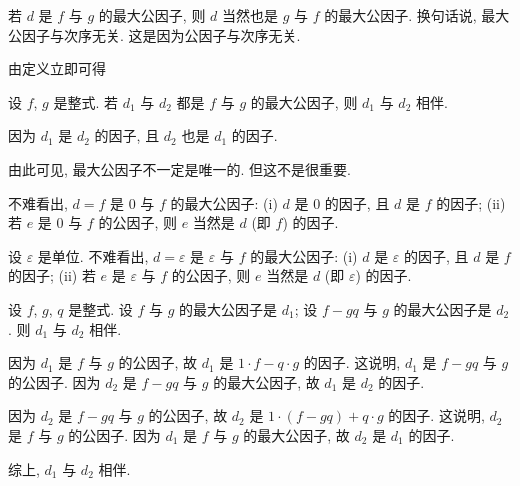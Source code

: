 \begin{remark}
    若 $d$ 是 $f$ 与 $g$ 的最大公因子, 则 $d$ 当然也是 $g$ 与 $f$ 的最大公因子. 换句话说, 最大公因子与次序无关. 这是因为公因子与次序无关.
\end{remark}

由定义立即可得
\begin{proposition}
    设 $f$, $g$ 是整式. 若 $d_1$ 与 $d_2$ 都是 $f$ 与 $g$ 的最大公因子, 则 $d_1$ 与 $d_2$ 相伴.
\end{proposition}

\begin{pf}
    因为 $d_1$ 是 $d_2$ 的因子, 且 $d_2$ 也是 $d_1$ 的因子.
\end{pf}

\begin{remark}
    由此可见, 最大公因子不一定是唯一的. 但这不是很重要.
\end{remark}

\begin{example}
    不难看出, $d = f$ 是 $0$ 与 $f$ 的最大公因子: (i) $d$ 是 $0$ 的因子, 且 $d$ 是 $f$ 的因子; (ii) 若 $e$ 是 $0$ 与 $f$ 的公因子, 则 $e$ 当然是 $d$ (即 $f$) 的因子.
\end{example}

\begin{example}
    设 $\varepsilon$ 是单位. 不难看出, $d = \varepsilon$ 是 $\varepsilon$ 与 $f$ 的最大公因子: (i) $d$ 是 $\varepsilon$ 的因子, 且 $d$ 是 $f$ 的因子; (ii) 若 $e$ 是 $\varepsilon$ 与 $f$ 的公因子, 则 $e$ 当然是 $d$ (即 $\varepsilon$) 的因子.
\end{example}

\begin{proposition}
    设 $f$, $g$, $q$ 是整式. 设 $f$ 与 $g$ 的最大公因子是 $d_1$; 设 $f - gq$ 与 $g$ 的最大公因子是 $d_2$. 则 $d_1$ 与 $d_2$ 相伴.
\end{proposition}

\begin{pf}
    因为 $d_1$ 是 $f$ 与 $g$ 的公因子, 故 $d_1$ 是 $1 \cdot f - q \cdot g$ 的因子. 这说明, $d_1$ 是 $f - gq$ 与 $g$ 的公因子. 因为 $d_2$ 是 $f - gq$ 与 $g$ 的最大公因子, 故 $d_1$ 是 $d_2$ 的因子.

    因为 $d_2$ 是 $f - gq$ 与 $g$ 的公因子, 故 $d_2$ 是 $1 \cdot (f - gq) + q \cdot g$ 的因子. 这说明, $d_2$ 是 $f$ 与 $g$ 的公因子. 因为 $d_1$ 是 $f$ 与 $g$ 的最大公因子, 故 $d_2$ 是 $d_1$ 的因子.

    综上, $d_1$ 与 $d_2$ 相伴.
\end{pf}

